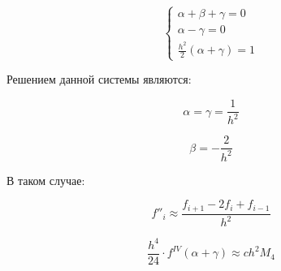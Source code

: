 \documentclass[10pt,a4paper]{article}
\begin{document}
		
		\begin{equation}
			\begin{cases}
				\alpha + \beta + \gamma = 0
				\\
				\alpha - \gamma = 0
				\\
				\frac{h^2}{2}\left(\alpha + \gamma\right) = 1
			\end{cases}
		\end{equation}
		
		Решением данной системы являются:
		
		\begin{equation}
			\alpha = \gamma = \frac{1}{h^2}
		\end{equation}
		
		\begin{equation}
			\beta = - \frac{2}{h^2}
		\end{equation}
		
		В таком случае:
		
		\begin{equation}
			f''_{i} \approx \frac{f_{i + 1} - 2f_{i} + f_{i - 1}}{h^2}
		\end{equation}
		
		\begin{equation}
			\frac{h^4}{24}\cdot f^{IV}\left(\alpha + \gamma\right) \approx ch^2M_{4}
		\end{equation}
\end{document}
